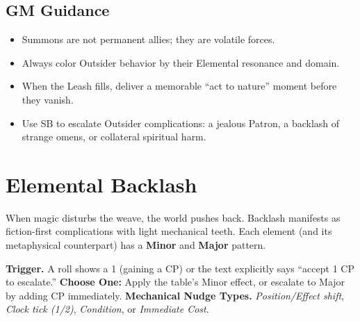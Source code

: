 \subsection{GM Guidance}
\begin{itemize}
  \item Summons are not permanent allies; they are volatile forces.
  \item Always color Outsider behavior by their Elemental resonance and domain.
  \item When the Leash fills, deliver a memorable “act to nature” moment before they vanish.
  \item Use SB to escalate Outsider complications: a jealous Patron, a backlash of strange omens, or collateral spiritual harm.
\end{itemize}


\section{Elemental Backlash}\label{sec:backlash-tables}

When magic disturbs the weave, the world pushes back. Backlash manifests as fiction-first complications with light mechanical teeth. Each element (and its metaphysical counterpart) has a \textbf{Minor} and \textbf{Major} pattern.

\begin{tcolorbox}[title={Using Backlash at the Table},colback=gray!5,colframe=black]
\textbf{Trigger.} A roll shows a 1 (gaining a CP) or the text explicitly says “accept 1 CP to escalate.”\newline
\textbf{Choose One:} Apply the table’s Minor effect, or escalate to Major by adding  CP immediately.\newline
\textbf{Mechanical Nudge Types.} \emph{Position/Effect shift}, \emph{Clock tick (1/2)}, \emph{Condition}, or \emph{Immediate Cost}.
\end{tcolorbox}

